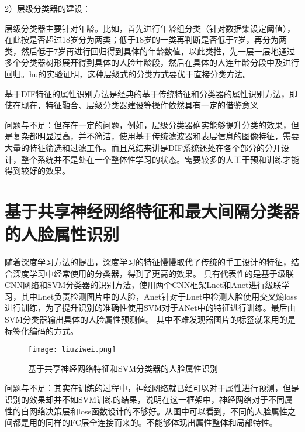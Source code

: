2）层级分类器的建设：

层级分类器主要针对年龄。比如，首先进行年龄组分类（针对数据集设定阈值），在此按是否超过18岁分为两类；低于18岁的一类再判断是否低于7岁，再分为两类，然后低于7岁再进行回归得到具体的年龄数值，以此类推，先一层一层地通过多个分类器树形展开得到具体的人脸年龄段，然后在具体的人连年龄分段中及进行回归。hu的实验证明，这种层级式的分类方式要优于直接分类方法。

基于DIF特征的属性识别方法是经典的基于传统特征和分类器的属性识别方法，即使在现在，特征融合、层级分类器建设等操作依然具有一定的借鉴意义

问题与不足：但存在一定的问题，例如，层级分类器确实能够提升分类的效果，但是复杂都明显过高，并不简洁，使用基于传统滤波器和表层信息的图像特征，需要大量的特征筛选和过滤工作。而且总结来讲是DIF系统还处在各个部分的分开设计，整个系统并不是处在一个整体性学习的状态。需要较多的人工干预和训练才能得到较好的效果。

\section{基于共享神经网络特征和最大间隔分类器的人脸属性识别}
随着深度学习方法的提出，深度学习的特征慢慢取代了传统的手工设计的特征，结合深度学习中经常使用的分类器，得到了更高的效果。
具有代表性的是基于级联CNN网络和SVM分类器的识别方法，使用两个CNN框架Lnet和Anet进行级联学习，其中Lnet负责检测图片中的人脸，Anet针对于Lnet中检测人脸使用交叉熵loss进行训练，为了提升识别的准确性使用SVM对于ANet中的特征进行训练。最后由SVM分类器输出具体的人脸属性预测值。
其中不难发现器图片的标签就采用的是标签化编码的方式。
\begin{figure}[!ht]
 \centering
	\texttt{[image: liuziwei.png]}
	\caption{基于共享神经网络特征和SVM分类器的人脸属性识别}
\end{figure}

问题与不足：其实在训练的过程中，神经网络就已经可以对于属性进行预测，但是识别的效果却并不如SVM训练的结果，说明在这一框架中，神经网络对于不同属性的自网络决策层和loss函数设计的不够好。从图中可以看到，不同的人脸属性之间都是用的同样的FC层全连接而来的。不能够体现出属性整体和局部特性。
 
